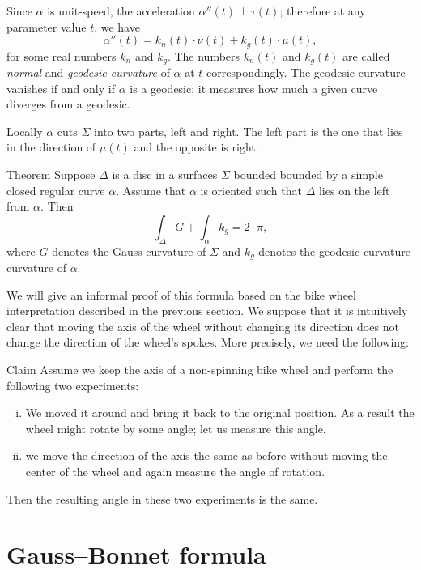 Since $\alpha$ is unit-speed, the acceleration $\alpha''(t)\perp\tau(t)$;
therefore at any parameter value $t$, we have
\[\alpha''(t)=k_n(t)\cdot \nu(t)+k_g(t)\cdot \mu(t),\]
for some real numbers $k_n$ and $k_g$.
The numbers $k_n(t)$ and $k_g(t)$ are called \emph{normal} and \emph{geodesic curvature} of $\alpha$ at $t$ correspondingly.
The geodesic curvature vanishes if and only if $\alpha$ is a geodesic; 
it measures how much a given curve diverges from a geodesic.

Locally $\alpha$ cuts $\Sigma$ into two parts, left and right.
The left part is the one that lies in the direction of $\mu(t)$ and the opposite is right.


\begin{thm}{Theorem}
Suppose $\Delta$ is a disc in a surfaces $\Sigma$ 
bounded bounded by a simple closed regular curve $\alpha$.
Assume that $\alpha$ is oriented such that $\Delta$ lies on the left from $\alpha$.
Then
\[\int_\Delta G+\int_\alpha k_g=2\cdot \pi,\]
where $G$ denotes the Gauss curvature of $\Sigma$ and
$k_g$ denotes the geodesic curvature curvature of $\alpha$.

\end{thm}

We will give an informal proof of this formula based on the bike wheel interpretation described in the previous section.
We suppose that it is intuitively clear that moving the axis of the wheel without changing its direction does not change the direction of the wheel's spokes.
More precisely, we need the following:

\begin{thm}{Claim}
Assume we keep the axis of a non-spinning bike wheel and perform the following two experiments:

\begin{enumerate}[(i)]
\item We moved it around and bring it back to the original position. 
As a result the wheel might rotate by some angle; let us measure this angle.

\item we move the direction of the axis the same as before without moving the center of the wheel and again measure the angle of rotation.
\end{enumerate}

Then the resulting angle in these two experiments is the same. 
\end{thm}

\section{Gauss--Bonnet formula}

